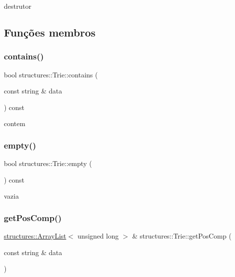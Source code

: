 destrutor 



\subsection{Funções membros}
\mbox{\label{classstructures_1_1Trie_a0b51abf86fd8e2302cf4b65f58982fb1}} 
\subsubsection{\texorpdfstring{contains()}{contains()}}
{\footnotesize\ttfamily bool structures\+::\+Trie\+::contains (\begin{DoxyParamCaption}\item[{const string \&}]{data }\end{DoxyParamCaption}) const}



contem 

\mbox{\label{classstructures_1_1Trie_a24bb9680f58b9c6879433adf8712c1ad}} 
\subsubsection{\texorpdfstring{empty()}{empty()}}
{\footnotesize\ttfamily bool structures\+::\+Trie\+::empty (\begin{DoxyParamCaption}{ }\end{DoxyParamCaption}) const}



vazia 

\mbox{\label{classstructures_1_1Trie_a93269c724024a2c2651203b2b034fbb5}} 
\subsubsection{\texorpdfstring{getPosComp()}{getPosComp()}}
{\footnotesize\ttfamily \mbox{\hyperlink{classstructures_1_1ArrayList}{structures\+::\+Array\+List}}$<$ unsigned long $>$ \& structures\+::\+Trie\+::get\+Pos\+Comp (\begin{DoxyParamCaption}\item[{const string \&}]{data }\end{DoxyParamCaption})}



